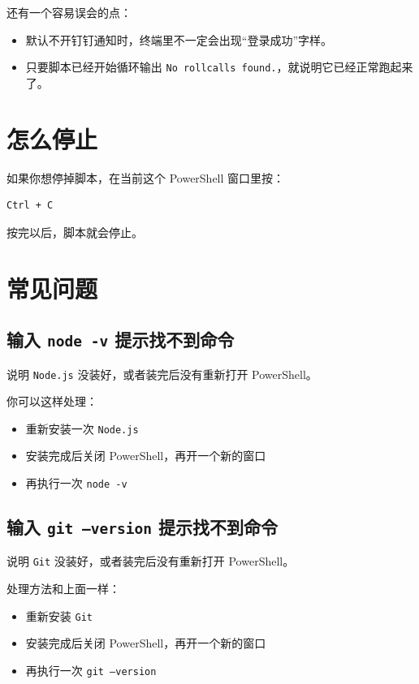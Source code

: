\documentclass[UTF8,12pt]{ctexart}
\begin{document}
\noindent 还有一个容易误会的点：

\begin{itemize}
  \item 默认不开钉钉通知时，终端里不一定会出现“登录成功”字样。
  \item 只要脚本已经开始循环输出 \texttt{No rollcalls found.}，就说明它已经正常跑起来了。
\end{itemize}

\section{怎么停止}

\noindent 如果你想停掉脚本，在当前这个 PowerShell 窗口里按：

\begin{verbatim}
Ctrl + C
\end{verbatim}

\noindent 按完以后，脚本就会停止。

\section{常见问题}

\subsection{输入 \texttt{node -v} 提示找不到命令}

\noindent 说明 \texttt{Node.js} 没装好，或者装完后没有重新打开 PowerShell。

\noindent 你可以这样处理：

\begin{itemize}
  \item 重新安装一次 \texttt{Node.js}
  \item 安装完成后关闭 PowerShell，再开一个新的窗口
  \item 再执行一次 \texttt{node -v}
\end{itemize}

\subsection{输入 \texttt{git --version} 提示找不到命令}

\noindent 说明 \texttt{Git} 没装好，或者装完后没有重新打开 PowerShell。

\noindent 处理方法和上面一样：

\begin{itemize}
  \item 重新安装 \texttt{Git}
  \item 安装完成后关闭 PowerShell，再开一个新的窗口
  \item 再执行一次 \texttt{git --version}
\end{itemize}
\end{document}

